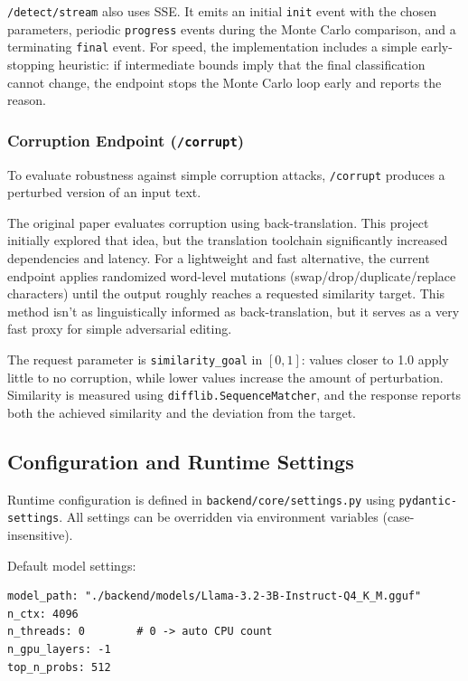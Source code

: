 \texttt{/detect/stream} also uses SSE. It emits an initial \texttt{init} event with the chosen parameters, periodic
\texttt{progress} events during the Monte Carlo comparison, and a terminating \texttt{final} event. For speed, the
implementation includes a simple early-stopping heuristic: if intermediate bounds imply that the final classification
cannot change, the endpoint stops the Monte Carlo loop early and reports the reason.
\subsubsection{Corruption Endpoint (\texttt{/corrupt})}
To evaluate robustness against simple corruption attacks, \texttt{/corrupt} produces a perturbed version of an input text.

The original paper evaluates corruption using back-translation. This project initially explored that idea, but the
translation toolchain significantly increased dependencies and latency. For a lightweight and fast alternative, the
current endpoint applies randomized word-level mutations (swap/drop/duplicate/replace characters) until the output
roughly reaches a requested similarity target. This method isn't as linguistically informed as back-translation, but it serves as a very fast proxy for simple adversarial editing.

The request parameter is \texttt{similarity\_goal} in $[0,1]$: values closer to 1.0 apply little to no corruption, while
lower values increase the amount of perturbation. Similarity is measured using \texttt{difflib.SequenceMatcher}, and the
response reports both the achieved similarity and the deviation from the target.
\subsection{Configuration and Runtime Settings}
Runtime configuration is defined in \texttt{backend/core/settings.py} using \texttt{pydantic-settings}. All settings
can be overridden via environment variables (case-insensitive).

Default model settings:
\begin{verbatim}
model_path: "./backend/models/Llama-3.2-3B-Instruct-Q4_K_M.gguf"
n_ctx: 4096
n_threads: 0        # 0 -> auto CPU count
n_gpu_layers: -1
top_n_probs: 512
\end{verbatim}
